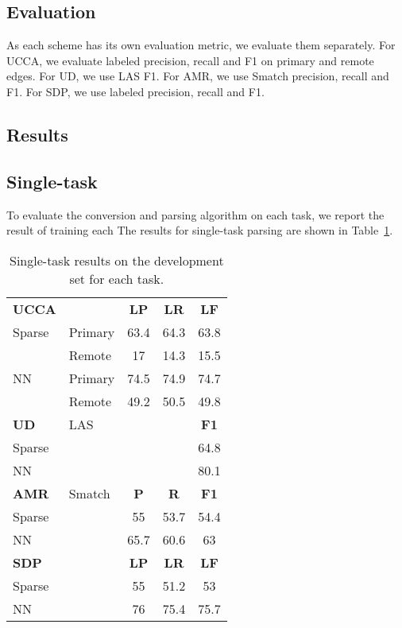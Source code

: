 \documentclass[11pt,a4paper]{article}
\begin{document}
\subsection{Evaluation}\label{sec:evaluation}

As each scheme has its own evaluation metric, we evaluate them separately.
For UCCA, we evaluate labeled precision, recall and F1 on primary and remote edges.
For UD, we use LAS F1.
For AMR, we use Smatch precision, recall and F1.
For SDP, we use labeled precision, recall and F1.


\subsection{Results}\label{sec:results}




\subsection{Single-task}\label{sec:results_single}

To evaluate the conversion and parsing algorithm on each task, we report the result
of training each 
The results for single-task parsing are shown in Table~\ref{tab:single}.



\begin{table}
\begin{tabular}{llccc}
\textbf{UCCA} & & \textbf{LP} & \textbf{LR} & \textbf{LF} \\
Sparse & \small Primary & 63.4 & 64.3 & 63.8 \\
       & \small Remote & 17 & 14.3 & 15.5 \\
NN & \small Primary & 74.5 & 74.9 & 74.7 \\
       & \small Remote & 49.2 & 50.5 & 49.8 \\
\hline
\textbf{UD} & \small LAS & & & \textbf{F1} \\
Sparse & & & & 64.8 \\
NN & & & & 80.1 \\
\hline
\textbf{AMR} & \small Smatch & \textbf{P} & \textbf{R} & \textbf{F1} \\
Sparse & & 55 & 53.7 & 54.4 \\
NN & & 65.7 & 60.6 & 63 \\
\hline
\textbf{SDP} & & \textbf{LP} & \textbf{LR} & \textbf{LF} \\
Sparse & & 55 & 51.2 & 53 \\
NN & & 76 & 75.4 & 75.7
\end{tabular}
\caption{Single-task results on the development set for each task.\label{tab:single}}
\end{table}
\end{document}

